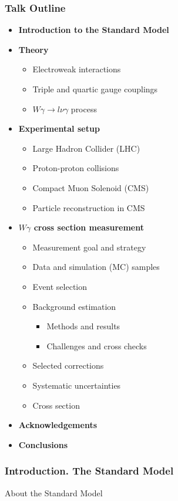 \begin{frame}\frametitle{Talk Outline}
  \begin{itemize}
     \item {\scriptsize\bfseries{Introduction to the Standard Model}}
     \item {\scriptsize\bfseries{Theory}}
       \begin{itemize}
          \tiny
          \item Electroweak interactions
          \item Triple and quartic gauge couplings
          \item $W\gamma\rightarrow l\nu\gamma$ process
       \end{itemize}
     \item {\scriptsize\bfseries{Experimental setup}}
       \begin{itemize}
          \tiny
          \item Large Hadron Collider (LHC)
          \item Proton-proton collisions
          \item Compact Muon Solenoid (CMS)
          \item Particle reconstruction in CMS
       \end{itemize}
     \item {\scriptsize\bfseries{$W\gamma$ cross section measurement}}
       \begin{itemize}
          \tiny
          \item Measurement goal and strategy 
          \item Data and simulation (MC) samples
          \item Event selection
          \item Background estimation
             \begin{itemize}
                \tiny
                \item Methods and results
                \item Challenges and cross checks 
             \end{itemize}
         \item Selected corrections
         \item Systematic uncertainties
         \item Cross section
       \end{itemize}
     \item {\scriptsize\bfseries{Acknowledgements}}
     \item {\scriptsize\bfseries{Conclusions}}
  \end{itemize}
\end{frame}%

\begin{frame}\frametitle{Introduction. The Standard Model}
\scriptsize
About the Standard Model
\end{frame}%


